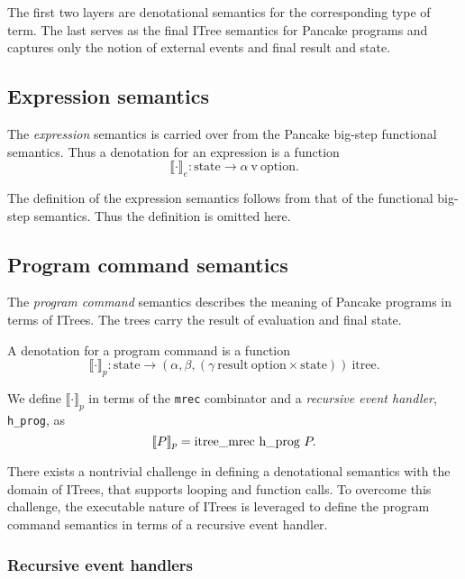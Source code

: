 \documentclass[a4paper]{amsbook}
\newcommand{\sem}[1]{\llbracket #1 \rrbracket}
\begin{document}
The first two layers are denotational semantics for the corresponding type of term. The last serves as the final ITree semantics for Pancake programs and captures only the notion of external events and final result and state.

\subsection{Expression semantics}
\label{sec:expression-semantics}

The \emph{expression} semantics is carried over from the Pancake big-step functional semantics. Thus a denotation for an expression is a function
\begin{equation*}
  \sem{\cdot}_{e} : \text{state} \to \alpha\ \text{v}\ \text{option}.
\end{equation*}

The definition of the expression semantics follows from that of the functional big-step semantics. Thus the definition is omitted here.

\subsection{Program command semantics}
\label{sec:progr-comm-semant-1}

The \emph{program command} semantics describes the meaning of Pancake programs in terms of ITrees. The trees carry the result of evaluation and final state.

A denotation for a program command is a function
\begin{equation*}
  \sem{\cdot}_{p} : \text{state} \to (\alpha, \beta, (\gamma\ \text{result}\ \text{option} \times \text{state}))\ \text{itree}.
\end{equation*}

We define $\sem{\cdot}_{p}$ in terms of the \verb|mrec| combinator and a \emph{recursive event handler}, \verb|h_prog|, as
\begin{equation*}
  \sem{P}_{p} = \text{\lstinline!itree\_mrec!}\ \text{\lstinline!h\_prog!}\ P.
\end{equation*}

There exists a nontrivial challenge in defining a denotational semantics with the domain of ITrees, that supports looping and function calls. To overcome this challenge, the executable nature of ITrees is leveraged to define the program command semantics in terms of a recursive event handler.

\subsubsection{Recursive event handlers}
\label{sec:event-handlers}
\end{document}
